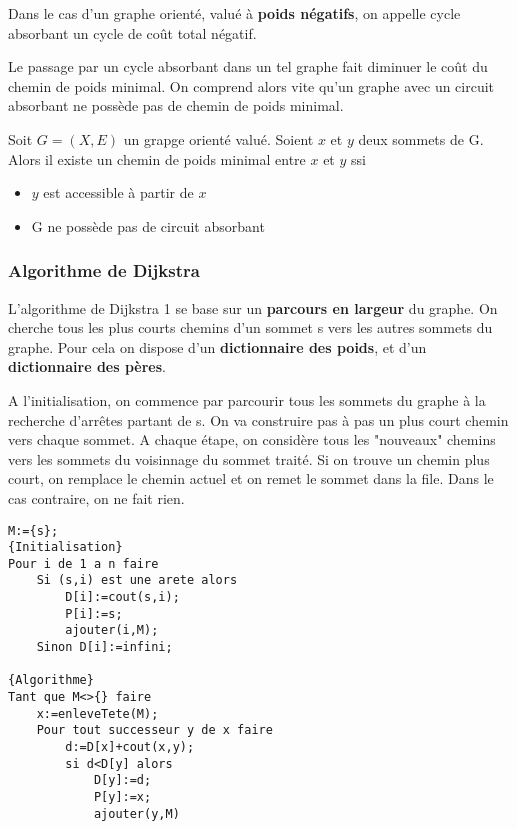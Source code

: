 \begin{definition}
    Dans le cas d'un graphe orienté, valué à \textbf{poids négatifs}, on appelle cycle absorbant 
    un cycle de coût total négatif. 
\end{definition}

\begin{remark}
    Le passage par un cycle absorbant dans un tel graphe fait diminuer le coût du chemin de poids minimal. 
    On comprend alors vite qu'un graphe avec un circuit absorbant ne possède pas de chemin de poids minimal. 
\end{remark}

\begin{theorem}
    Soit $G = (X,E)$ un grapge orienté valué. Soient $x$ et $y$ deux sommets de G. 
    Alors il existe un chemin de poids minimal entre $x$ et $y$ ssi 
    \begin{itemize}
        \item $y$ est accessible à partir de $x$ 
        \item G ne possède pas de circuit absorbant
    \end{itemize}
\end{theorem}


\subsubsection{Algorithme de Dijkstra}

L'algorithme de Dijkstra 1 se base sur un \textbf{parcours en largeur} du graphe. 
On cherche tous les plus courts chemins d'un sommet s vers les autres sommets du graphe. 
Pour cela on dispose d'un \textbf{dictionnaire des poids}, et d'un \textbf{dictionnaire des pères}. 


A l'initialisation, on commence par parcourir tous les sommets du graphe à la recherche d'arrêtes partant de s. 
On va construire pas à pas un plus court chemin vers chaque sommet. A chaque étape, on considère tous les "nouveaux"
chemins vers les sommets du voisinnage du sommet traité. Si on trouve un chemin plus court, on remplace le chemin actuel et on remet le sommet dans la file. 
Dans le cas contraire, on ne fait rien. 

\begin{lstlisting}
M:={s};
{Initialisation}
Pour i de 1 a n faire
    Si (s,i) est une arete alors
        D[i]:=cout(s,i);
        P[i]:=s;
        ajouter(i,M);
    Sinon D[i]:=infini;

{Algorithme}
Tant que M<>{} faire
    x:=enleveTete(M);
    Pour tout successeur y de x faire
        d:=D[x]+cout(x,y);
        si d<D[y] alors
            D[y]:=d;
            P[y]:=x;
            ajouter(y,M)
\end{lstlisting}

